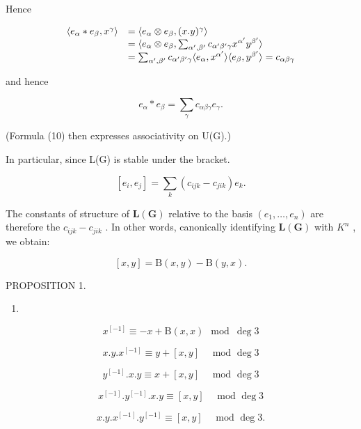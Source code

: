 Hence

\[
\begin{array}{r l} \langle e _ {\alpha} * e _ {\beta}, x ^ {\gamma} \rangle & = \langle e _ {\alpha} \otimes e _ {\beta}, (x. y) ^ {\gamma} \rangle \\ & = \langle e _ {\alpha} \otimes e _ {\beta}, \sum_ {\alpha^ {\prime}, \beta^ {\prime}} c _ {\alpha^ {\prime} \beta^ {\prime} \gamma} x ^ {\alpha^ {\prime}} y ^ {\beta^ {\prime}} \rangle \\ & = \sum_ {\alpha^ {\prime}, \beta^ {\prime}} c _ {\alpha^ {\prime} \beta^ {\prime} \gamma} \langle e _ {\alpha}, x ^ {\alpha^ {\prime}} \rangle \langle e _ {\beta}, y ^ {\beta^ {\prime}} \rangle = c _ {\alpha \beta \gamma} \end{array}
\]

and hence

\[
e _ {\alpha} * e _ {\beta} = \sum_ {\gamma} c _ {\alpha \beta \gamma} e _ {\gamma}.\tag{11}
\]

(Formula (10) then expresses associativity on U(G).)

In particular, since L(G) is stable under the bracket.

\[
[ e _ {i}, e _ {j} ] = \sum_ {k} (c _ {i j k} - c _ {j i k}) e _ {k}.\tag{12}
\]

The constants of structure of \(\mathbf{L}(\mathbf{G})\) relative to the basis \((e_{1},\ldots,e_{n})\) are therefore the \(c_{ijk}-c_{jik}\) . In other words, canonically identifying \(\mathbf{L}(\mathbf{G})\) with \(K^{n}\) , we obtain:

\[
[ x, y ] = \mathrm{B} (x, y) - \mathrm{B} (y, x).\tag{13}
\]

PROPOSITION 1.

\begin{enumerate}
\def\labelenumi{(\roman{enumi})}
\tightlist
\item
\end{enumerate}

\[
x ^ {[ - 1 ]} \equiv - x + \mathrm{B} (x, x) \mod \deg 3\tag{i}
\]

\[
x. y. x ^ {[ - 1 ]} \equiv y + [ x, y ] \quad \text {   mod   } \deg 3\tag{ii}
\]

\[
y ^ {[ - 1 ]}. x. y \equiv x + [ x, y ] \quad \text {   mod   } \deg 3\tag{iii}
\]

\[
x ^ {[ - 1 ]}. y ^ {[ - 1 ]}. x. y \equiv [ x, y ] \quad \text {   mod   } \deg 3\tag{iv}
\]

\[
x. y. x ^ {[ - 1 ]}. y ^ {[ - 1 ]} \equiv [ x, y ] \quad \text {   mod   } \deg 3\tag{v}.
\]


